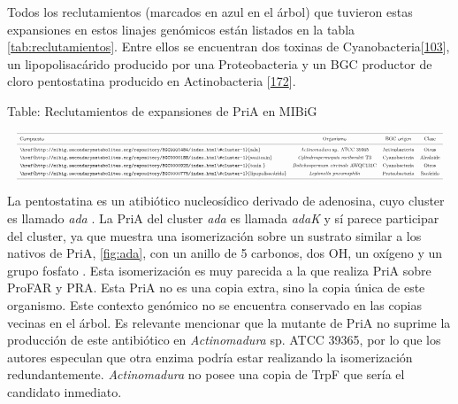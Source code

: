 \documentclass[12pt,twoside]{reedthesis}
\begin{document}
  Todos los reclutamientos (marcados en azul en el árbol) que tuvieron
  estas expansiones en estos linajes genómicos están listados en la tabla
  \autoref{tab:reclutamientos}. Entre ellos se encuentran dos toxinas de
  Cyanobacteria{[}\protect\hyperlink{ref-moustafa_origin_2009}{103}{]}, un
  lipopolisacárido producido por una Proteobacteria y un BGC productor de
  cloro pentostatina producido en Actinobacteria
  {[}\protect\hyperlink{ref-gao_biosynthesis_2017}{172}{]}.
  
  Table: Reclutamientos de expansiones de PriA en MIBiG
  \label{tab:reclutamientos}
  
  \[
  \resizebox{\columnwidth}{!}{%
  \begin{tabular}{ l c c c}
  \hline \\ [-1.5ex]  
  Compuesto & Organismo & BGC origen & Clase \\ [1ex]  
  \hline \\ [-1.5ex]
  \href{http://mibig.secondarymetabolites.org/repository/BGC0001484/index.html\#cluster-1}{ada}&\textit{Actinomadura} sp. ATCC 39365&Actinobacteria& Otros      \\ [1ex]  
  \href{http://mibig.secondarymetabolites.org/repository/BGC0000188/index.html\#cluster-1}{saxitoxin}&\textit{Cylindrospermopsis~raciborskii} T3&Cyanobacteria&Alcaloide \\ [1ex]  
  \href{http://mibig.secondarymetabolites.org/repository/BGC0000928/index.html\#cluster-1}{toxin }&\textit{Dolichospermum~circinale} AWQC131C & Cyanobacteria & Otros    \\ [1ex]  
  \href{http://mibig.secondarymetabolites.org/repository/BGC0000775/index.html\#cluster-1}{lipopolisacárido}  &\textit{Legionella~pneumophila}    & Proteobacteria & Sac\'arido    \\ [1ex]  
  \hline
  \end{tabular}}
  \] \normalsize
  
  La pentostatina es un atibiótico nucleosídico derivado de adenosina,
  cuyo cluster es llamado \emph{ada} . La PriA del cluster \emph{ada} es
  llamada \emph{adaK} y sí parece participar del cluster, ya que muestra
  una isomerización sobre un sustrato similar a los nativos de PriA,
  \autoref{fig:ada}, con un anillo de 5 carbonos, dos OH, un oxígeno y un
  grupo fosfato . Esta isomerización es muy parecida a la que realiza PriA
  sobre ProFAR y PRA. Esta PriA no es una copia extra, sino la copia única
  de este organismo. Este contexto genómico no se encuentra conservado en
  las copias vecinas en el árbol. Es relevante mencionar que la mutante de
  PriA no suprime la producción de este antibiótico en \emph{Actinomadura}
  sp. ATCC 39365, por lo que los autores especulan que otra enzima podría
  estar realizando la isomerización redundantemente. \emph{Actinomadura}
  no posee una copia de TrpF que sería el candidato inmediato.
  
\end{document}
